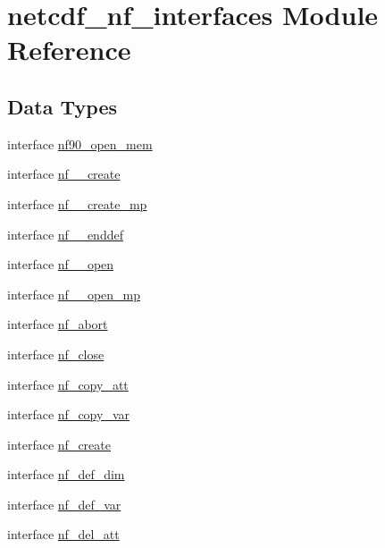 \hypertarget{namespacenetcdf__nf__interfaces}{}\section{netcdf\+\_\+nf\+\_\+interfaces Module Reference}
\label{namespacenetcdf__nf__interfaces}
\subsection*{Data Types}
\begin{DoxyCompactItemize}
\item 
interface \hyperlink{interfacenetcdf__nf__interfaces_1_1nf90__open__mem}{nf90\+\_\+open\+\_\+mem}
\item 
interface \hyperlink{interfacenetcdf__nf__interfaces_1_1nf____create}{nf\+\_\+\+\_\+create}
\item 
interface \hyperlink{interfacenetcdf__nf__interfaces_1_1nf____create__mp}{nf\+\_\+\+\_\+create\+\_\+mp}
\item 
interface \hyperlink{interfacenetcdf__nf__interfaces_1_1nf____enddef}{nf\+\_\+\+\_\+enddef}
\item 
interface \hyperlink{interfacenetcdf__nf__interfaces_1_1nf____open}{nf\+\_\+\+\_\+open}
\item 
interface \hyperlink{interfacenetcdf__nf__interfaces_1_1nf____open__mp}{nf\+\_\+\+\_\+open\+\_\+mp}
\item 
interface \hyperlink{interfacenetcdf__nf__interfaces_1_1nf__abort}{nf\+\_\+abort}
\item 
interface \hyperlink{interfacenetcdf__nf__interfaces_1_1nf__close}{nf\+\_\+close}
\item 
interface \hyperlink{interfacenetcdf__nf__interfaces_1_1nf__copy__att}{nf\+\_\+copy\+\_\+att}
\item 
interface \hyperlink{interfacenetcdf__nf__interfaces_1_1nf__copy__var}{nf\+\_\+copy\+\_\+var}
\item 
interface \hyperlink{interfacenetcdf__nf__interfaces_1_1nf__create}{nf\+\_\+create}
\item 
interface \hyperlink{interfacenetcdf__nf__interfaces_1_1nf__def__dim}{nf\+\_\+def\+\_\+dim}
\item 
interface \hyperlink{interfacenetcdf__nf__interfaces_1_1nf__def__var}{nf\+\_\+def\+\_\+var}
\item 
interface \hyperlink{interfacenetcdf__nf__interfaces_1_1nf__del__att}{nf\+\_\+del\+\_\+att}
\item 

\end{DoxyCompactItemize}
